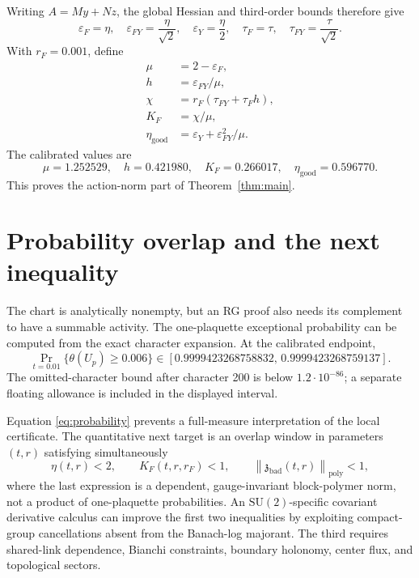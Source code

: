 \documentclass[11pt]{article}
\theoremstyle{definition}
\newcommand{\SU}{\mathrm{SU}(2)}
\newcommand{\norm}[1]{\left\lVert #1\right\rVert}
\begin{document}
Writing $A=My+Nz$, the global Hessian and third-order bounds therefore give
\begin{equation}\label{eq:five}
 \varepsilon_F=\eta,\quad
 \varepsilon_{FY}=\frac\eta{\sqrt2},\quad
 \varepsilon_Y=\frac\eta2,\quad
 \tau_F=\tau,\quad
 \tau_{FY}=\frac\tau{\sqrt2}.
\end{equation}
With $r_F=0.001$, define
\begin{align*}
 \mu&=2-\varepsilon_F,\\
 h&=\varepsilon_{FY}/\mu,\\
 \chi&=r_F(\tau_{FY}+\tau_Fh),\\
 K_F&=\chi/\mu,\\
 \eta_{\mathrm{good}}&=\varepsilon_Y+\varepsilon_{FY}^2/\mu.
\end{align*}
The calibrated values are
\[
 \mu=1.252529,\quad h=0.421980,\quad
 K_F=0.266017,\quad \eta_{\mathrm{good}}=0.596770.
\]
This proves the action-norm part of Theorem~\ref{thm:main}.

\section{Probability overlap and the next inequality}

The chart is analytically nonempty, but an RG proof also needs its complement
to have a summable activity.  The one-plaquette exceptional probability can
be computed from the exact character expansion.  At the calibrated endpoint,
\begin{equation}\label{eq:probability}
 \Pr_{t=0.01}\{\theta(U_p)\ge0.006\}
 \in[0.9999423268758832,\,0.9999423268759137].
\end{equation}
The omitted-character bound after character 200 is below $1.2\cdot10^{-86}$;
a separate floating allowance is included in the displayed interval.

Equation \eqref{eq:probability} prevents a full-measure interpretation of the
local certificate.  The quantitative next target is an overlap window in
parameters $(t,r)$ satisfying simultaneously
\begin{equation}\label{eq:overlap}
 \eta(t,r)<2,\qquad K_F(t,r,r_F)<1,\qquad
 \norm{\mathfrak z_{\mathrm{bad}}(t,r)}_{\mathrm{poly}}<1,
\end{equation}
where the last expression is a dependent, gauge-invariant block-polymer norm,
not a product of one-plaquette probabilities.  An $\SU$-specific covariant
derivative calculus can improve the first two inequalities by exploiting
compact-group cancellations absent from the Banach-log majorant.  The third
requires shared-link dependence, Bianchi constraints, boundary holonomy,
center flux, and topological sectors.
\end{document}
